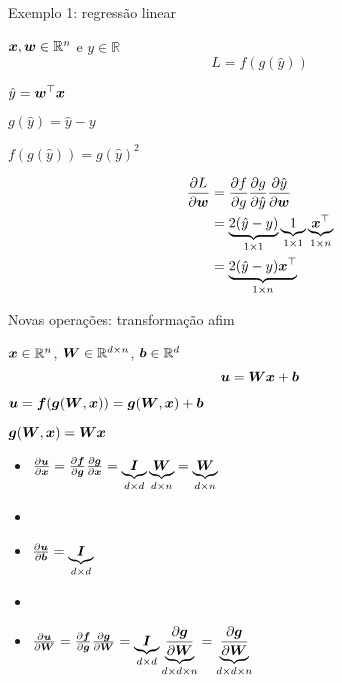 \documentclass[10pt]{beamer}
\begin{document}
\begin{frame}{Exemplo 1: regressão linear}
\large{

$\bm{x},\bm{w} \in \mathbb{R}^{n}$ e $y \in \mathbb{R}$
\begin{equation*}
L = f(g(\hat{y}))
\end{equation*}

$\hat{y} = \bm{w}^{\top}\bm{x}$

$g(\hat{y}) = \hat{y} - y$

$f(g(\hat{y})) = g(\hat{y})^2$


\begin{align*}
\frac{\partial L}{\partial \bm{w}} &= \frac{\partial f}{\partial g}\frac{\partial g}{\partial \hat{y}}\frac{\partial \hat{y}}{\partial \bm{w}}\\
&= \underbrace{2(\hat{y} - y)}_{\tiny{1 \times 1}} \underbrace{1}_{\tiny{1 \times 1}} \underbrace{\bm{x}^{\top}}_{\tiny{1 \times n}} \\
&= \underbrace{2(\hat{y} - y)\bm{x}^{\top}}_{\tiny{1 \times n}} 
\end{align*}
}
\end{frame}

\begin{frame}{Novas operações: transformação afim}
\large{
$\bm{x}\in \mathbb{R}^{n}$, $\bm{W} \in \mathbb{R}^{d\times n}$, $\bm{b}\in \mathbb{R}^{d}$
\vspace{0.1 cm}
\begin{equation*}
\bm{u} = \bm{W}\bm{x} + \bm{b}
\end{equation*}

\vspace{0.2 cm}
$\bm{u} = \bm{f}(\bm{g}(\bm{W},\bm{x})) =\bm{g}(\bm{W}, \bm{x}) + \bm{b}$

\vspace{0.2 cm}
$\bm{g}(\bm{W}, \bm{x}) = \bm{W}\bm{x}$

\vspace{0.2 cm}
\begin{itemize}
\item $\frac{\partial \bm{u}}{\partial \bm{x}} = \frac{\partial \bm{f}}{\partial \bm{g}}\frac{\partial \bm{g}}{\partial \bm{x}} = \underbrace{\bm{I}}_{\tiny{d \times d}}\underbrace{\bm{W}}_{\tiny{d \times n}} = \underbrace{\bm{W}}_{\tiny{d \times n}}$
\item[]
\item $\frac{\partial \bm{u}}{\partial \bm{b}} = \underbrace{\bm{I}}_{\tiny{d \times d}}$
\item[]
\item $\frac{\partial \bm{u}}{\partial \bm{W}} = \frac{\partial \bm{f}}{\partial \bm{g}}\frac{\partial \bm{g}}{\partial \bm{W}} = \underbrace{\bm{I}}_{\tiny{d \times d}}\underbrace{\frac{\partial \bm{g}}{\partial \bm{W}}}_{\tiny{d \times d \times n}} = \underbrace{\frac{\partial \bm{g}}{\partial \bm{W}}}_{\tiny{d \times d \times n}}$
\end{itemize}
}
\end{frame}
\end{document}
